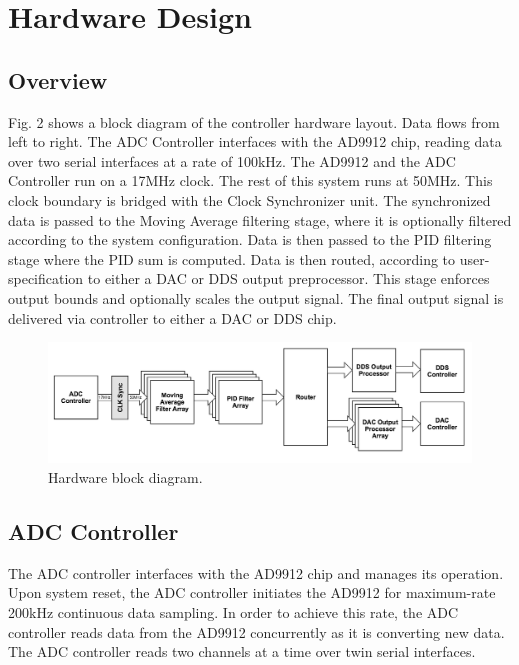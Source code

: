 \documentclass[11pt]{article}
\begin{document}
\section{Hardware Design}

\subsection{Overview}

Fig. 2 shows a block diagram of the controller hardware layout. Data
flows from left to right. The ADC Controller interfaces with the AD9912
chip, reading data over two serial interfaces at a rate of 100kHz. The
AD9912 and the ADC Controller run on a 17MHz clock. The rest of this
system runs at 50MHz. This clock boundary is bridged with the Clock
Synchronizer unit. The synchronized data is passed to the Moving
Average filtering stage, where it is optionally filtered according to
the system configuration. Data is then passed to the PID filtering stage
where the PID sum is computed. Data is then routed, according to
user-specification to either a DAC or DDS output preprocessor. This
stage enforces output bounds and optionally scales the output signal.
The final output signal is delivered via controller to either a DAC or
DDS chip.

\begin{figure}[h]
\includegraphics[width=\textwidth]{hardware_design}
\caption{Hardware block diagram.}
\end{figure}

\subsection{ADC Controller}

The ADC controller interfaces with the AD9912 chip and manages its
operation. Upon system reset, the ADC controller initiates the AD9912
for maximum-rate 200kHz continuous data sampling. In order to
achieve this rate, the ADC controller reads data from the AD9912
concurrently as it is converting new data. The ADC controller reads two
channels at a time over twin serial interfaces.
\end{document}
